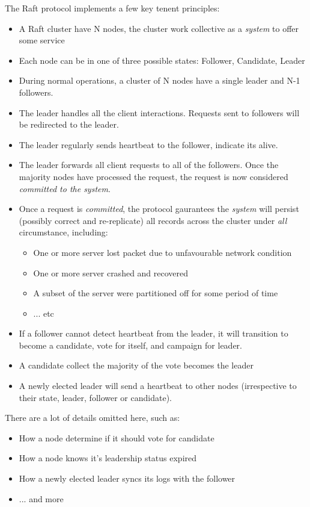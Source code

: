 \documentclass{report}
\begin{document}
The Raft protocol implements a few key tenent principles:
\begin{itemize}
    \item A Raft cluster have N nodes, the cluster work collective as a
    \textit{system} to offer some service
    \item Each node can be in one of three possible states: Follower, Candidate, Leader
    \item During normal operations, a cluster of N nodes have a single leader
    and N-1 followers.
    \item The leader handles all the client interactions. Requests sent to followers will be 
    redirected to the leader. 
    \item The leader regularly sends heartbeat to the follower, indicate its
    alive.
    \item The leader forwards all client requests to all of the followers. Once 
    the majority nodes have processed the request, the request is now considered
    \textit{committed to the system}. 
    \item Once a request is \textit{committed}, the protocol gaurantees the
    \textit{system} will persist (possibly correct and re-replicate) all
    records across the cluster under \textit{all} circumstance, including: 
    \begin{itemize}
        \item One or more server lost packet due to unfavourable network condition 
        \item One or more server crashed and recovered
        \item A subset of the server were partitioned off for some period of time
        \item ... etc
    \end{itemize}
    \item If a follower cannot detect heartbeat from the leader, it will
    transition to become a candidate, vote for itself, and campaign for leader.
    \item A candidate collect the majority of the vote becomes the leader
    \item A newly elected leader will send a heartbeat to other nodes
    (irrespective to their state, leader, follower or candidate).
\end{itemize}
There are a lot of details omitted here, such as:
\begin{itemize}
    \item How a node determine if it should vote for candidate
    \item How a node knows it's leadership status expired
    \item How a newly elected leader syncs its logs with the follower
    \item ... and more
\end{itemize}
\end{document}

